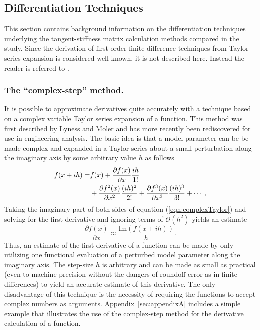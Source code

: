 \documentclass[preprint,12pt]{elsarticle}
\begin{document}
\subsection{Differentiation Techniques}

This section contains background information on the differentiation techniques underlying the tangent-stiffness matrix calculation methods compared in the study. Since the derivation of first-order finite-difference techniques from Taylor series expansion is considered well known, it is not described here. Instead the reader is referred to \cite[Chap. 4.1.3]{chapra2010}.

\subsubsection{The ``complex-step'' method.}  
\label{sec:CSmethod}
It is possible to approximate derivatives quite accurately with a technique based on a complex variable Taylor series expansion of a function.  This method was first described by Lyness and Moler \cite{lyness1967numerical,lyness1968differentiation} and has more recently been rediscovered \cite{squire1998using,voorhees2011complex,al2010complex,martins2000automated} for use in engineering analysis.  The basic idea is that a model parameter can be be made complex and expanded in a Taylor series about a small perturbation along the imaginary axis by some arbitrary value $h$ as follows
%
\begin{align}
f ( x + i h ) =& f(x) + \frac{\partial f(x)}{\partial x} \frac{i h}{1!}  \notag \\
               &+ \frac{\partial f^2(x)}{\partial x^2} \frac{(i h)^2}{2!} + \frac{\partial f^3(x)}{\partial x^3} \frac{(i h)^3}{3!} + \cdots,
\label{eqn:complexTaylor}
\end{align}
%
Taking the imaginary part of both sides of equation (\ref{eqn:complexTaylor}) and solving for the first derivative and ignoring terms of $\mathcal{O}\left ( h^2 \right)$ yields an estimate
%
\begin{equation}
 \frac{\partial f( x )}{\partial x} \approx \frac{\mbox{Im} \left( f (x + i h) \right)}{h}.
\label{eqn:complexFirstDeriv}
\end{equation}
%
Thus, an estimate of the first derivative of a function can be made by only utilizing one functional evaluation of a perturbed model parameter along the imaginary axis.  The step-size $h$ is arbitrary and can be made as small as practical (even to machine precision without the dangers of roundoff error as in finite-differences) to yield an accurate estimate of this derivative.  The only disadvantage of this technique is the necessity of requiring the functions to accept complex numbers as arguments. Appendix~\ref{sec:appendixA} includes a simple example that illustrates the use of the complex-step method for the derivative calculation of a function. 
\end{document}
